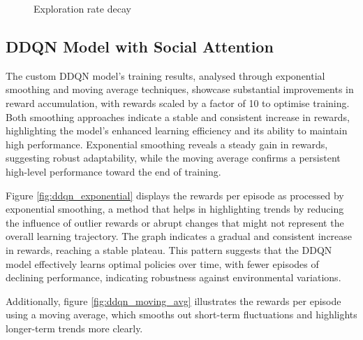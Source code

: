\documentclass{article}
\begin{document}
\begin{figure}[ht]
\begin{minipage}{0.48\textwidth}
    \caption{Exploration rate decay}
    \label{fig:exploration_rate}
  \end{minipage}\hfill
\end{figure}

\subsection{DDQN Model with Social Attention}

The custom DDQN model's training results, analysed through exponential smoothing and moving average techniques, showcase substantial improvements in reward accumulation, with rewards scaled by a factor of 10 to optimise training. Both smoothing approaches indicate a stable and consistent increase in rewards, highlighting the model's enhanced learning efficiency and its ability to maintain high performance. Exponential smoothing reveals a steady gain in rewards, suggesting robust adaptability, while the moving average confirms a persistent high-level performance toward the end of training.

Figure \ref{fig:ddqn_exponential} displays the rewards per episode as processed by exponential smoothing, a method that helps in highlighting trends by reducing the influence of outlier rewards or abrupt changes that might not represent the overall learning trajectory. The graph indicates a gradual and consistent increase in rewards, reaching a stable plateau. This pattern suggests that the DDQN model effectively learns optimal policies over time, with fewer episodes of declining performance, indicating robustness against environmental variations.

Additionally, figure \ref{fig:ddqn_moving_avg} illustrates the rewards per episode using a moving average, which smooths out short-term fluctuations and highlights longer-term trends more clearly.
\end{document}
